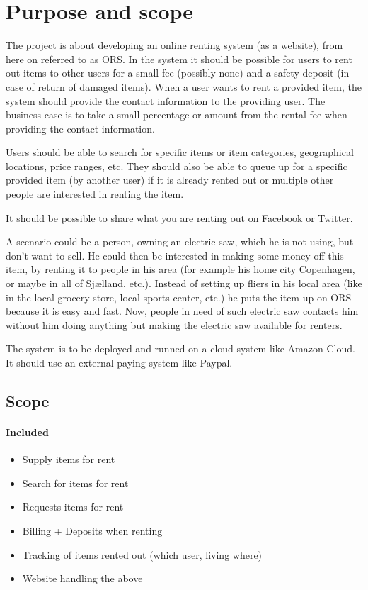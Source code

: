 \documentclass[a4paper,11pt]{report}
\begin{document}
\section{Purpose and scope}
\label{sec:purpose-scope}
The project is about developing an online renting system (as a website), from
here on referred to as ORS. In the system it should be possible for users to
rent out items to other users for a small fee (possibly none) and a safety
deposit (in case of return of damaged items). When a user wants to rent a
provided item, the system should provide the contact information to the
providing user. The business case is to take a small percentage or amount from
the rental fee when providing the contact information.

Users should be able to search for specific items or item categories,
geographical locations, price ranges, etc. They should also be able to queue up
for a specific provided item (by another user) if it is already rented out or
multiple other people are interested in renting the item.

It should be possible to share what you are renting out on Facebook or Twitter.

A scenario could be a person, owning an electric saw, which he is not using, but
don't want to sell. He could then be interested in making some money off this
item, by renting it to people in his area (for example his home city Copenhagen,
or maybe in all of Sjælland, etc.). Instead of setting up fliers in his local
area (like in the local grocery store, local sports center, etc.) he puts the
item up on ORS because it is easy and fast. Now, people in need of such electric
saw contacts him without him doing anything but making the electric saw
available for renters.

The system is to be deployed and runned on a cloud system like Amazon Cloud. It should use an external paying system like Paypal.

\subsection{Scope}
\paragraph{Included}
\begin{itemize}
\item Supply items for rent
\item Search for items for rent
\item Requests items for rent
\item Billing + Deposits when renting
\item Tracking of items rented out (which user, living where)
\item Website handling the above
\end{itemize}
\end{document}
